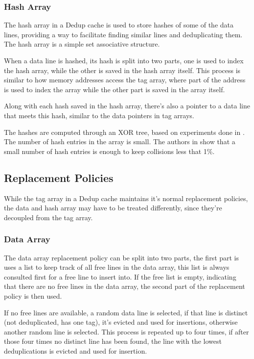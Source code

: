 \subsubsection{Hash Array}
\label{sssec:DedupHash}
The hash array in a Dedup cache is used to store hashes of some of the data lines, providing a way to facilitate finding similar lines and deduplicating them. The hash array is a simple set associative structure.\par
When a data line is hashed, its hash is split into two parts, one is used to index the hash array, while the other is saved in the hash array itself. This process is similar to how memory addresses access the tag array, where part of the address is used to index the array while the other part is saved in the array itself.\par
Along with each hash saved in the hash array, there's also a pointer to a data line that meets this hash, similar to the data pointers in tag arrays.\par
The hashes are computed through an XOR tree, based on experiments done in \cite{dedup}. The number of hash entries in the array is small. The authors in \cite{dedup} show that a small number of hash entries is enough to keep collisions less that 1\%.

\subsection{Replacement Policies}
\label{ssec:DedupRepl}
While the tag array in a Dedup cache maintains it's normal replacement policies, the data and hash array may have to be treated differently, since they're decoupled from the tag array.
\subsubsection{Data Array}
\label{ref:DedupDataRepl}
The data array replacement policy can be split into two parts, the first part is uses a list to keep track of all free lines in the data array, this list is always consulted first for a free line to insert into. If the free list is empty, indicating that there are no free lines in the data array, the second part of the replacement policy is then used.\par
If no free lines are available, a random data line is selected, if that line is distinct (not deduplicated, has one tag), it's evicted and used for insertions, otherwise another random line is selected. This process is repeated up to four times, if after those four times no distinct line has been found, the line with the lowest deduplications is evicted and used for insertion.
